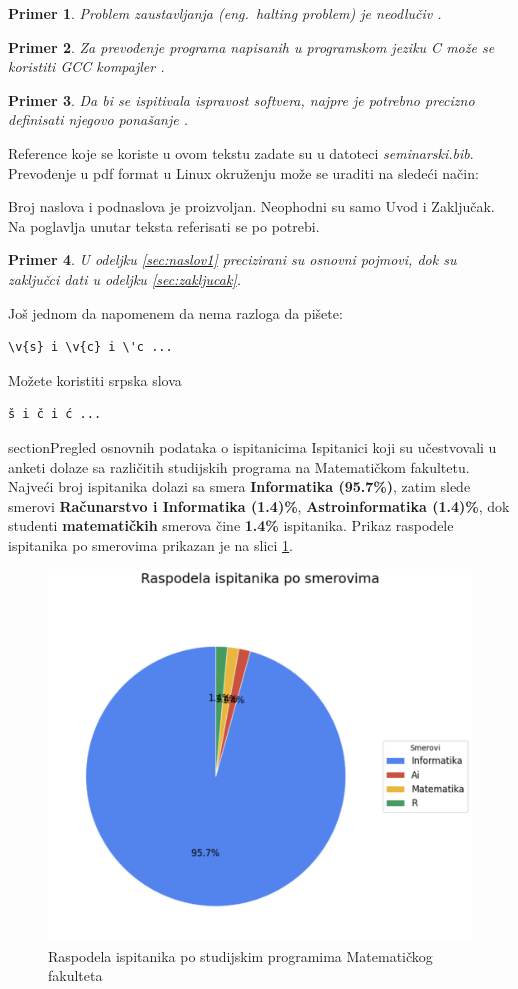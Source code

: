 \documentclass[a4paper]{article}
\newtheorem{primer}{Primer}[section]
\begin{document}
\begin{primer}
Problem zaustavljanja (eng.~{\em halting problem}) je neodlučiv \cite{haltingproblem}.
\end{primer}

\begin{primer}
Za prevođenje programa napisanih u programskom jeziku C može se koristiti GCC kompajler \cite{gcc}.
\end{primer}

\begin{primer}
 Da bi se ispitivala ispravost softvera, najpre je potrebno precizno definisati njegovo ponašanje \cite{laski2009software}. 
\end{primer}

Reference koje se koriste u ovom tekstu zadate su u datoteci {\em seminarski.bib}. Prevođenje u pdf format u Linux okruženju može se uraditi na sledeći način:










Broj naslova i podnaslova je proizvoljan. Neophodni su samo Uvod i Zaključak. Na poglavlja unutar teksta referisati se po potrebi. 
\begin{primer}
U odeljku \ref{sec:naslov1} precizirani su osnovni pojmovi, dok su zaključci dati u odeljku \ref{sec:zakljucak}.
\end{primer}

Još jednom da napomenem da nema razloga da pišete:
\begin{verbatim}
\v{s} i \v{c} i \'c ...
\end{verbatim}
Možete koristiti srpska slova
\begin{verbatim}
š i č i ć ... 
\end{verbatim}

section{Pregled osnovnih podataka o ispitanicima}
Ispitanici koji su učestvovali u anketi dolaze sa različitih studijskih programa na Matematičkom fakultetu. Najveći broj ispitanika dolazi sa smera \textbf{Informatika (95.7\%)}, zatim slede smerovi \textbf{Računarstvo i Informatika (1.4)\%}, \textbf{Astroinformatika (1.4)\%}, dok studenti \textbf{matematičkih} smerova čine \textbf{1.4\%} ispitanika. Prikaz raspodele ispitanika po smerovima prikazan je na slici \ref{fig:raspodela_smerovi}. 

\begin{figure}[H]
    \centering
    \includegraphics[width=0.5\linewidth]{raspodela_ispitanika.png}
    \caption{Raspodela ispitanika po studijskim programima Matematičkog fakulteta}
    \label{fig:raspodela_smerovi}
\end{figure}
\end{document}

